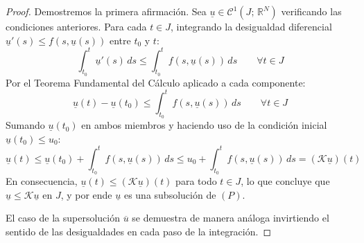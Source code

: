\begin{proof}
    Demostremos la primera afirmación. Sea $\underline{u} \in \mathcal{C}^1(J; \, \mathbb{R}^N)$ verificando las condiciones anteriores. Para cada $t \in J$, integrando la desigualdad diferencial $\underline{u}'(s) \leq f(s, \underline{u}(s))$ entre $t_0$ y $t$:
    \[
        \int_{t_0}^t \underline{u}'(s) \, ds \leq \int_{t_0}^t f(s, \underline{u}(s)) \, ds \qquad \forall t \in J
    \]
    Por el Teorema Fundamental del Cálculo aplicado a cada componente:
    \[
        \underline{u}(t) - \underline{u}(t_0) \leq \int_{t_0}^t f(s, \underline{u}(s)) \, ds \qquad \forall t \in J
    \]
    Sumando $\underline{u}(t_0)$ en ambos miembros y haciendo uso de la condición inicial $\underline{u}(t_0) \leq u_0$:
    \[
        \underline{u}(t) \leq \underline{u}(t_0) + \int_{t_0}^t f(s, \underline{u}(s)) \, ds \leq u_0 + \int_{t_0}^t f(s, \underline{u}(s)) \, ds = (\mathcal{K}\underline{u})(t)
    \]
    En consecuencia, $\underline{u}(t) \leq (\mathcal{K}\underline{u})(t)$ para todo $t \in J$, lo que concluye que $\underline{u} \leq \mathcal{K}\underline{u}$ en $J$, y por ende $\underline{u}$ es una subsolución de $(P)$.

    El caso de la supersolución $\overline{u}$ se demuestra de manera análoga invirtiendo el sentido de las desigualdades en cada paso de la integración.
\end{proof}

